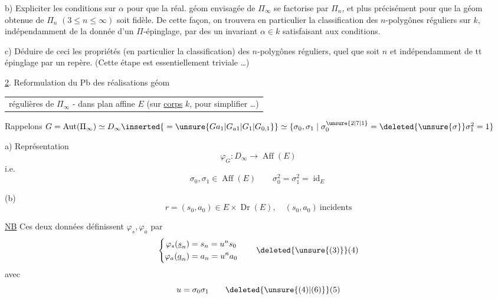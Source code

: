 b) Expliciter les conditions sur $\alpha$
pour que la réal. géom envisagée de
$\Pi_\infty$ se factorise par $\Pi_n$, et plus
précisément pour que la   géom
obtenue de $\Pi_n$ $(3\leq n\leq\infty)$ soit
fidèle. De cette façon, on trouvera en
particulier la classification des  $n$-polygônes
réguliers sur $k$, indépendamment de la
donnée d'un $\Pi$-épinglage, par des
 un invariant $\alpha\in k$ satisfaisant aux 
conditions.

c) Déduire de ceci les  propriétés
  (en particulier la classification)
des $n$-polygônes réguliers, quel que soit $n$
et indépendamment de tt épinglage
par un repère. (Cette étape est
essentiellement triviale \ldots)

\uline{2}. Reformulation du Pb des réalisations géom
\begin{tabular}{|p{.91\linewidth}}régulières de $\Pi_\infty$ - dans plan affine $E$
(sur \uline{corps} $k$, pour simplifier \ldots)\end{tabular}

Rappelons $G=\operatorname{Aut}(\Pi_\infty)\simeq D_\infty\inserted{{}=\unsure{Ga_1|G_{a1}|G_1|G_{0,1}}}\simeq\{\sigma_0,\sigma_1\mid\sigma_0^{\unsure{2|7|1}}=\deleted{\unsure{\sigma}}\sigma_1^2=1\}$

a) Représentation
\[ \varphi_G:D_\infty\longrightarrow\operatorname{Aff}(E) \tag*{(1)} \]
i.e.
\[ \boxed{\sigma_0,\sigma_1\in\operatorname{Aff}(E)\qquad \sigma_0^2=\sigma_1^2=\operatorname{id}_E} \tag*{(2)} \]

(b)
\[ \boxed{r=(s_0,a_0)\in E\times\operatorname{Dr}(E),\quad(s_0,a_0)\ \text{incidents}} \tag*{(3)} \]

\uline{NB} Ces deux données définissent $\varphi_s,\varphi_a$ par
\[ \left\{\begin{aligned}\varphi_s(\underline{s}_n)&=s_n=u^n s_0\\
\varphi_a(\underline{a}_n)&=a_n=u^n a_0\end{aligned}\right. \tag*{\deleted{\unsure{(3)}}(4)} \]
avec
\[ u=\sigma_0\sigma_1 \tag*{\deleted{\unsure{(4)|(6)}}(5)} \]

